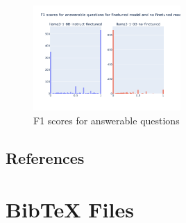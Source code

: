 \documentclass[11pt]{article}
\begin{document}
\begin{figure}[ht]
    \centering
    \includegraphics[width=0.5\textwidth]{week_41_f1_scores_answerable.png}
    \caption{F1 scores for answerable questions}
    \label{fig:week41_f1_scores_answerable}
\end{figure}




\subsection{References}

\nocite{Ando2005,andrew2007scalable,rasooli-tetrault-2015, rajpurkar-etal-2018-know, hu2021loralowrankadaptationlarge, risch2021semanticanswersimilarityevaluating}
\section{Bib\TeX{} Files}
\label{sec:bibtex}

\end{document}
